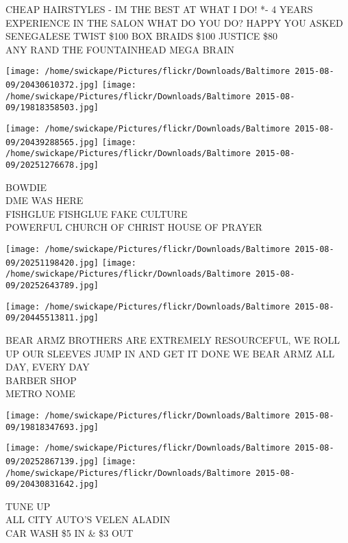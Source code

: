 \documentclass[10pt,letterpaper]{article}
\begin{document}
CHEAP HAIRSTYLES {-} IM THE BEST AT WHAT I DO!  *{-} 4 YEARS EXPERIENCE IN THE SALON WHAT DO YOU DO?  HAPPY YOU ASKED SENEGALESE TWIST \$100 BOX BRAIDS \$100 JUSTICE \$80\\
ANY RAND THE FOUNTAINHEAD MEGA BRAIN\\
\pagebreak

\texttt{[image: /home/swickape/Pictures/flickr/Downloads/Baltimore 2015-08-09/20430610372.jpg]}
\texttt{[image: /home/swickape/Pictures/flickr/Downloads/Baltimore 2015-08-09/19818358503.jpg]}

\texttt{[image: /home/swickape/Pictures/flickr/Downloads/Baltimore 2015-08-09/20439288565.jpg]}
\texttt{[image: /home/swickape/Pictures/flickr/Downloads/Baltimore 2015-08-09/20251276678.jpg]}

BOWDIE\\
DME WAS HERE\\
FISHGLUE FISHGLUE FAKE CULTURE\\
POWERFUL CHURCH OF CHRIST HOUSE OF PRAYER\\
\pagebreak

\texttt{[image: /home/swickape/Pictures/flickr/Downloads/Baltimore 2015-08-09/20251198420.jpg]}
\texttt{[image: /home/swickape/Pictures/flickr/Downloads/Baltimore 2015-08-09/20252643789.jpg]}

\vspace{0.25in}
\texttt{[image: /home/swickape/Pictures/flickr/Downloads/Baltimore 2015-08-09/20445513811.jpg]}

BEAR ARMZ BROTHERS ARE EXTREMELY RESOURCEFUL, WE ROLL UP OUR SLEEVES JUMP IN AND GET IT DONE WE BEAR ARMZ ALL DAY, EVERY DAY\\
BARBER SHOP\\
METRO NOME\\
\pagebreak

\texttt{[image: /home/swickape/Pictures/flickr/Downloads/Baltimore 2015-08-09/19818347693.jpg]}

\vspace{0.25in}
\texttt{[image: /home/swickape/Pictures/flickr/Downloads/Baltimore 2015-08-09/20252867139.jpg]}
\texttt{[image: /home/swickape/Pictures/flickr/Downloads/Baltimore 2015-08-09/20430831642.jpg]}

TUNE UP\\
ALL CITY AUTO'S VELEN ALADIN\\
CAR WASH \$5 IN \& \$3 OUT\\
\pagebreak
\end{document}
